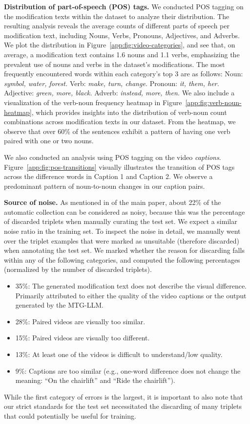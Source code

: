 \noindent\textbf{Distribution of part-of-speech (POS) tags.}
We conducted POS tagging on the modification texts within the \ourDS dataset to analyze their distribution. 
The resulting analysis reveals the average counts of different parts of speech per modification text, including Nouns, Verbs, Pronouns, Adjectives, and Adverbs. 
We plot the distribution in Figure~\ref{app:fig:video-categories},
and see that, on average, a modification text contains 1.6 nouns and 1.1 verbs, 
emphasizing the prevalent use of nouns and verbs in the dataset's modifications. 
The most frequently encountered words within each category's top 3 are as follows:
    Noun: \textit{symbol, water, forest.}
    Verb: \textit{make, turn, change.}
    Pronoun: \textit{it, them, her.}
    Adjective: \textit{green, more, black.}
    Adverb: \textit{instead, more, then.}
We also include a visualization of the verb-noun frequency heatmap in Figure~\ref{app:fig:verb-noun-heatmap}, which provides insights into the distribution of verb-noun count combinations across modification texts in our dataset. From the heatmap, we observe that over 60\% of the sentences exhibit a pattern of having one verb paired with one or two nouns.

We also conducted an analysis using POS tagging on the video {\em captions}.
Figure~\ref{app:fig:pos-transitions} visually illustrates the transition of POS tags across
the difference words in Caption 1 and Caption 2. We observe a predominant pattern of noun-to-noun
changes in our caption pairs.


\noindent\textbf{Source of noise.}
As mentioned in 
\if{} \fi
of the main paper,
about 22\% of the automatic collection can be considered as noisy, 
because this was the percentage of discarded triplets when manually curating the \ourDS test set. 
We expect a similar noise ratio in the training set. To inspect the noise in detail, we manually went over the triplet examples that were marked as unsuitable (therefore discarded) 
when annotating the test set. 
We marked whether the reason for discarding falls within any of the following categories, 
and computed the following percentages (normalized by the number of discarded triplets).
\begin{itemize}
    \item 35\%: The generated modification text does not describe the visual difference. Primarily attributed to either the quality of the video captions or the output generated by the MTG-LLM.
    \item 28\%: Paired videos are visually too similar.
    \item 15\%: Paired videos are visually too different.
    \item 13\%: At least one of the videos is difficult to understand/low quality.
    \item 9\%: Captions are too similar (e.g., one-word difference does not change the meaning: ``On the chairlift'' and ``Ride the chairlift'').
\end{itemize}
While the first category of errors is the largest, it is important to also note that our strict standards for the test set necessitated the discarding of many triplets that could potentially be useful for training.

